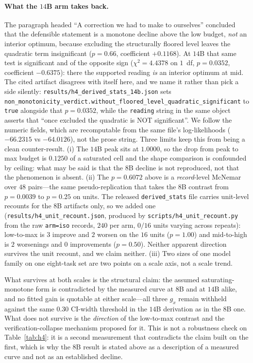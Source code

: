 \documentclass[10pt]{article} %
\begin{document}
\paragraph{What the $14$B arm takes back.}
The paragraph headed ``A correction we had to make to ourselves'' concluded that the
defensible statement is a
monotone decline above the low budget, \emph{not} an interior optimum, because excluding the
structurally floored level leaves the quadratic term insignificant ($p{=}0.66$, coefficient
$+0.1168$). At $14$B that same test is significant and of the opposite sign ($\chi^2{=}4.4378$
on $1$~df, $p{=}0.0352$, coefficient $-0.6375$): there the supported reading \emph{is} an
interior optimum at mid. The cited artifact disagrees with itself here, and we name it rather
than pick a side silently: \texttt{results/h4\_derived\_stats\_14b.json} sets
\texttt{non\_monotonicity\_verdict.without\_floored\_level\_quadratic\_significant} to
\texttt{true} alongside that $p{=}0.0352$, while the \texttt{reading} string in the same object
asserts that ``once excluded the quadratic is NOT significant''. We follow the numeric fields,
which are recomputable from the same file's log-likelihoods ($-66.2315$ vs $-64.0126$), not the
prose string. Three limits keep this from being a clean counter-result. (i) The
$14$B peak sits at $1.0000$, so the drop from peak to max budget is $0.1250$ of a saturated
cell and the shape comparison is confounded by ceiling: what may be said is that the $8$B
decline is not reproduced, not that the phenomenon is absent. (ii) The $p{=}0.6072$ above is
a \emph{record}-level McNemar over $48$ pairs---the same pseudo-replication that takes the
$8$B contrast from $p{=}0.0039$ to $p{=}0.25$ on units. The released \texttt{derived\_stats}
file carries unit-level recounts for the $8$B artifacts only, so we added one
(\texttt{results/h4\_unit\_recount.json}, produced by \texttt{scripts/h4\_unit\_recount.py}
from the raw \texttt{arm=iso} records, $240$ per arm, $0/16$ units varying across repeats):
low-to-max is
$3$ improve and $2$ worsen on the $16$ units ($p{=}1.00$) and mid-to-high is $2$ worsenings
and $0$ improvements ($p{=}0.50$). Neither apparent direction survives the unit recount, and
we claim neither. (iii) Two sizes of
one model family on one eight-task set are two points on a scale axis, not a scale trend.

What survives at both scales is the structural claim: the assumed saturating-monotone form is
contradicted by the measured curve at $8$B and at $14$B alike, and no fitted gain is quotable
at either scale---all three $g_x$ remain withheld against the same $0.30$ CI-width threshold
in the $14$B derivation as in the $8$B one. What does not survive is the \emph{direction} of
the low-to-max contrast and the verification-collapse mechanism proposed for it. This is not
a robustness check on Table~\ref{tab:h4}: it is a second measurement that contradicts the
claim built on the first, which is why the $8$B result is stated above as a description of a
measured curve and not as an established decline.
\end{document}

